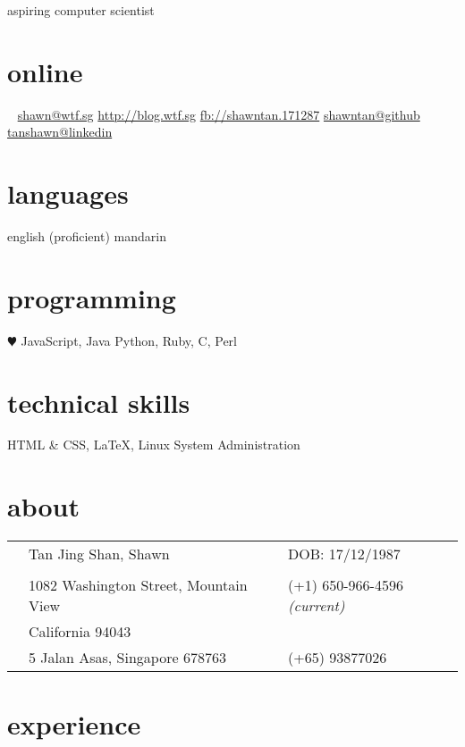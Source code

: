 \documentclass[]{friggeri-cv}
\begin{document}
{aspiring computer scientist}
\begin{aside}
	\section{online}
	\Email~ \href{mailto:shawn@wtf.sg}{shawn@wtf.sg}
	\href{http://blog.wtf.sg}{http://blog.wtf.sg}
	\href{http://facebook.com/shawntan.171287}{fb://shawntan.171287}
	\href{http://github.com/shawntan}{shawntan@github}
	\href{http://sg.linkedin.com/in/tanshawn}{tanshawn@linkedin}
	\section{languages}
	english (proficient)
	mandarin
	\section{programming}
	{\color{red} $\varheartsuit$} JavaScript, Java
	Python, Ruby, C, Perl
	\section{technical skills}
	HTML \& CSS, \LaTeX,
	Linux System Administration
\end{aside}
\section{about}
\begin{tabular}{ p{0.45cm} p{6.5cm} p{0.45cm} p{6.5cm} }
	\Male 	& Tan Jing Shan, Shawn	 & \Sagittarius &  DOB: 17/12/1987\\
	\\
	\Letter & 1082 Washington Street, Mountain View & \Mobilefone  & (+1) 
	650-966-4596  {\footnotesize\textit{(current)}}\\
			& California 94043 & & \\
	\Letter & 5 Jalan Asas, Singapore 678763 & \Mobilefone & (+65) 93877026 \\
\end{tabular}

\section{experience}
\end{document}
